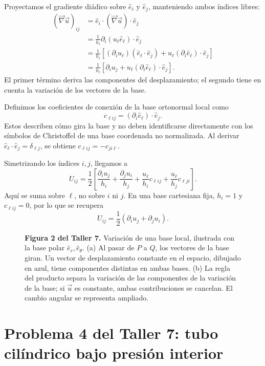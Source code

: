 Proyectamos el gradiente diádico sobre $\hat e_i$ y $\hat e_j$, manteniendo ambos índices libres:
\[
\begin{aligned}
(\vec\nabla\vec u)_{ij}
&=\hat e_i\cdot(\vec\nabla\vec u)\cdot\hat e_j\\
&=\frac{1}{h_i}\partial_i(u_\ell\hat e_\ell)\cdot\hat e_j\\
&=\frac{1}{h_i}
\left[(\partial_i u_\ell)(\hat e_\ell\cdot\hat e_j)
+u_\ell(\partial_i\hat e_\ell)\cdot\hat e_j\right]\\
&=\frac{1}{h_i}
\left[\partial_i u_j+u_\ell(\partial_i\hat e_\ell)\cdot\hat e_j\right].
\end{aligned}
\]
El primer término deriva las componentes del desplazamiento; el segundo tiene en cuenta la variación de los vectores de la base.

Definimos los coeficientes de conexión de la base ortonormal local como
\[
c_{\ell i j}=(\partial_i\hat e_\ell)\cdot\hat e_j.
\]
Estos describen cómo gira la base y no deben identificarse directamente con los símbolos de Christoffel de una base coordenada no normalizada. Al derivar $\hat e_\ell\cdot\hat e_j=\delta_{\ell j}$, se obtiene $c_{\ell i j}=-c_{j i\ell}$.

Simetrizando los índices $i,j$, llegamos a
\[
\boxed{U_{ij}=\frac{1}{2}
\left[
\frac{\partial_i u_j}{h_i}
+\frac{\partial_j u_i}{h_j}
+\frac{u_\ell}{h_i}c_{\ell i j}
+\frac{u_\ell}{h_j}c_{\ell j i}
\right]}.
\]
Aquí se suma sobre $\ell$, no sobre $i$ ni $j$. En una base cartesiana fija, $h_i=1$ y $c_{\ell i j}=0$, por lo que se recupera
\[
U_{ij}=\frac{1}{2}(\partial_i u_j+\partial_j u_i).
\]


\begin{figure}[H]
\centering

\par\medskip
\begin{minipage}{\textwidth}
\textbf{Figura 2 del Taller 7.} Variación de una base local, ilustrada con la base polar $\hat e_r,\hat e_\theta$. (a) Al pasar de $P$ a $Q$, los vectores de la base giran. Un vector de desplazamiento constante en el espacio, dibujado en azul, tiene componentes distintas en ambas bases. (b) La regla del producto separa la variación de las componentes de la variación de la base; si $\vec u$ es constante, ambas contribuciones se cancelan. El cambio angular se representa ampliado.
\end{minipage}
\end{figure}

\section{Problema 4 del Taller 7: tubo cilíndrico bajo presión interior}

